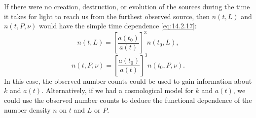 If there were no creation, destruction, or evolution of the sources during
the time it takes for light to reach us from the furthest observed source,
then \(n(t,L)\) and \(n(t,P,\nu)\) would have the simple time dependence
\eqref{eq:14.2.17}:
\begin{equation}
  n(t,L)
  =
  \left[\frac{a(t_0)}{a(t)}\right]^3n(t_0,L),
  \tag{14.7.18}\label{eq:14.7.18}
\end{equation}
\begin{equation}
  n(t,P,\nu)
  =
  \left[\frac{a(t_0)}{a(t)}\right]^3n(t_0,P,\nu).
  \tag{14.7.19}\label{eq:14.7.19}
\end{equation}
In this case, the observed number counts could be used to gain information
about \(k\) and \(a(t)\). Alternatively, if we had a cosmological model for
\(k\) and \(a(t)\), we could use the observed number counts to deduce the
functional dependence of the number density \(n\) on \(t\) and \(L\) or
\(P\).

